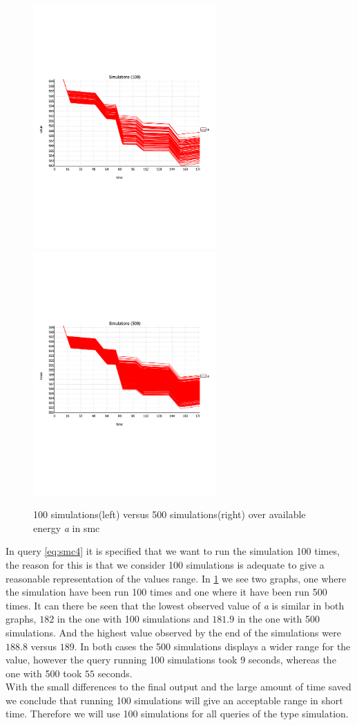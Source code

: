 \begin{figure}[H]%
	\centering
	\subfloat
	{{\includegraphics[width=7cm, trim={0 8cm 0 6cm},clip] {graphics/simulation_graphs/SimulationsA100.pdf} }}%
	\qquad
	\subfloat
	{{\includegraphics[width=7cm, trim={0 8cm 0 6cm},clip] {graphics/simulation_graphs/SimulationsA500.pdf} }}%
	\caption{100 simulations(left) versus 500 simulations(right) over available energy \textit{a} in smc}%
	\label{fig:sim_amount}%
\end{figure}
In query \ref{eq:smc4} it is specified that we want to run the simulation 100 times, the reason for this is that we consider 100 simulations is adequate to give a reasonable representation of the values range. In \cref{fig:sim_amount} we see two graphs, one where the simulation have been run 100 times and one where it have been run 500 times. It can there be seen that the lowest observed value of \textit{a} is similar in both graphs, $182$ in the one with 100 simulations and $181.9$ in the one with 500 simulations. And the highest value observed by the end of the simulations were $188.8$ versus $189$. In both cases the 500 simulations displays a wider range for the value, however the query running 100 simulations took $9$ seconds, whereas the one with 500 took $55$ seconds.\\
With the small differences to the final output and the large amount of time saved we conclude that running 100 simulations will give an acceptable range in short time. Therefore we will use 100 simulations for all queries of the type simulation.

